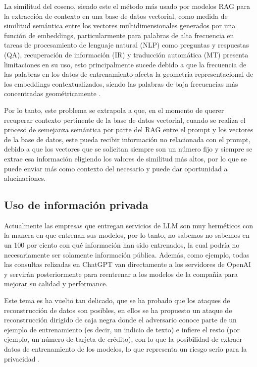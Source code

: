La similitud del coseno, siendo este el método más usado por modelos RAG para la extracción de contexto en una base de datos vectorial, 
como medida de similitud semántica entre los vectores multidimensionales generados por una función de embeddings, particularmente para palabras de alta frecuencia en tareas de 
procesamiento de lenguaje natural (NLP) como preguntas y respuestas (QA), recuperación de información (IR) y traducción 
automática (MT) presenta limitaciones en su uso, esto principalmente sucede debido a que la frecuencia de las palabras en los 
datos de entrenamiento afecta la geometría representacional de los embeddings contextualizados, siendo las palabras de baja 
frecuencias más concentradas geométricamente \cite{coseno}.

Por lo tanto, este problema se extrapola a que, en el momento de querer recuperar contexto pertinente de la base de datos vectorial, 
cuando se realiza el proceso de semejanza semántica por parte del RAG entre el prompt y los vectores de la base de datos, este pueda recibir 
información no relacionada con el prompt, debido a que los vectores que se solicitan siempre son un número fijo y siempre se extrae esa información eligiendo los valores de similitud más altos, por lo que se puede enviar más como contexto del necesario y puede dar oportunidad a alucinaciones.

\subsection{Uso de información privada}

Actualmente las empresas que entregan servicios de LLM son muy herméticos con la manera en que entrenan sus modelos, por lo tanto, no sabemos no sabemos en un 100 por ciento
con qué información han sido entrenados, la cual podría no necesariamente ser solamente información pública. Además, como ejemplo, todas las consultas relizadas en ChatGPT van directamente a los servidores de OpenAI y servirán posteriormente para reentrenar a los modelos de la compañia para mejorar su calidad y performance.

Este tema es ha vuelto tan delicado, que se ha probado que los ataques de reconstrucción de datos son posibles, en ellos se ha propuesto un ataque de reconstrucción dirigido de caja negra donde el 
adversario conoce parte de un ejemplo de entrenamiento (es decir, un indicio de texto) e infiere el resto (por ejemplo, un número de tarjeta de crédito), 
con lo que la posibilidad de extraer datos de entrenamiento de los modelos, lo que representa un riesgo serio para la privacidad \cite{privacidad1}. 

